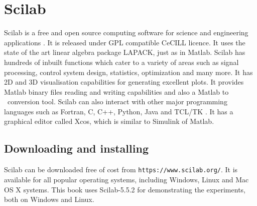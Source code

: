 
\section{Scilab}
\label{sec:sci-start}
Scilab is a free and open source computing software for science and
engineering applications \cite{scilab-ref}. It is released under GPL
compatible CeCILL licence.  It uses the state of the art linear
algebra package LAPACK, just as in Matlab.  Scilab has hundreds of
inbuilt functions which cater to a variety of areas such as signal
processing, control system design, statistics, optimization and many
more. It has 2D and 3D visualisation capabilities for generating
excellent plots. It provides Matlab binary files reading and writing
capabilities and also a Matlab to \scilab\ conversion tool. Scilab can
also interact with other major programming languages such as Fortran,
C, C++, Python, Java and TCL/TK \cite{scilab-interop}.  It has a
graphical editor called Xcos, which is similar to Simulink of Matlab. 

\subsection{Downloading and installing \scilab}\label{scilab-installation}
Scilab can be downloaded free of cost from {\tt https://www.scilab.org/}. It is
available for all popular operating systems, including Windows, Linux
and Mac OS X systems.  This book uses Scilab-5.5.2 for demonstrating
the experiments, both on Windows and Linux.


